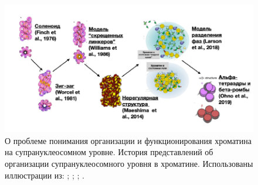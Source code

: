 \begin{figure} [H]
    \centering
    \includegraphics[width=\textwidth]{images/p6/p6_1_vved/p6_1_f3.pdf}
    \caption[О проблеме понимания организации и функционирования хроматина на супрануклеосомном уровне]{О проблеме понимания организации и функционирования хроматина на супрануклеосомном уровне. История представлений об организации супрануклеосомного уровня в хроматине. Использованы иллюстрации из: \cite{wu_variable_2007}; \cite{maeshima_chromatin_2014}; \cite{larson_role_2018}; \cite{ohno_sub-nucleosomal_2019}.}
    \label{fig:p6_1_f3}
\end{figure}
    
